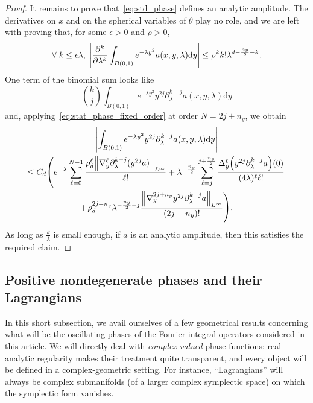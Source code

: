 \documentclass[AHL,Unicode,longabstracts,published]{cedram}
\newcommand\1{\mathds{1}}
\newcommand{\dd}{\mathrm{d}}
\let\oldforall\forall
\renewcommand*{\forall}{\mathrel{\oldforall}}
\let\originalleft\left
\let\originalright\right
\renewcommand{\left}{\mathopen{}\mathclose\bgroup\originalleft}
\renewcommand{\right}{\aftergroup\egroup\originalright}
\begin{document}
\begin{proof}
It remains to prove that~\eqref{eq:std_phase} defines an analytic amplitude. The derivatives on $x$ and on the spherical variables of $\theta$ play no role, and we are left with proving that, for some $\epsilon>0$ and $\rho>0$,
\[
\forall k\leq \epsilon \lambda,\;\left|\frac{\partial^k}{\partial
\lambda^k}\int_{B(0,1)}e^{-\lambda y^2}a(x,y,\lambda)\dd y
\right|\leq \rho^{k}k!\lambda^{d-\frac{n_y}{2}-k}.
\]
One term of the binomial sum looks like
\[
\binom{k}{j}\int_{B(0,1)}e^{-\lambda y^2}y^{2j}\partial_\lambda^{k-j}a(x,y,\lambda)\dd y
\]
and, applying~\eqref{eq:stat_phase_fixed_order} at order $N=2j+n_y$, we obtain
\begin{multline*}
\left|\int_{B(0,1)}e^{-\lambda y^2}y^{2j}\partial_\lambda^{k-j}a(x,y,\lambda)\dd y\right|\\ \leq C_d\left(e^{-\lambda}\sum_{\ell=0}^{N-1}\frac{\rho_d^\ell\left\|\nabla^\ell_y\partial^{k-j}_{\lambda}(y^{2j}a)\right\|_{L^{\infty}}}{\ell!}+\lambda^{-\frac{n_y}{2}}\sum_{\ell=j}^{j+\frac{n_y}{2}}\frac{\Delta^\ell_y\left(y^{2j}\partial_{\lambda}^{k-j}a\right)(0)}{(4\lambda)^\ell \ell!}\right.\\
+\left.\rho_d^{2j+n_y}\lambda^{-\frac{n_y}{2}-j}\frac{\left\|\nabla^{2j+n_y}_yy^{2j}\partial^{k-j}_{\lambda}a\right\|_{L^{\infty}}}{(2j+n_y)!}\right).
\end{multline*}
As long as $\frac{k}{\lambda}$ is small enough, if $a$ is an analytic amplitude, then this satisfies the required claim.
\end{proof}


\subsection{Positive nondegenerate phases and their Lagrangians}\label{sec:posit-nond-phas}

In this short subsection, we avail ourselves of a few geometrical results concerning what will be the oscillating phases of the Fourier {integral operators} considered in this article. We will directly deal with \emph{complex-valued} phase functions; real-analytic regularity makes their treatment quite transparent, and every object will be defined in a complex-geometric setting. For instance, ``Lagrangians'' will always be complex submanifolds (of a larger complex symplectic space) on which the symplectic form vanishes.
\end{document}
